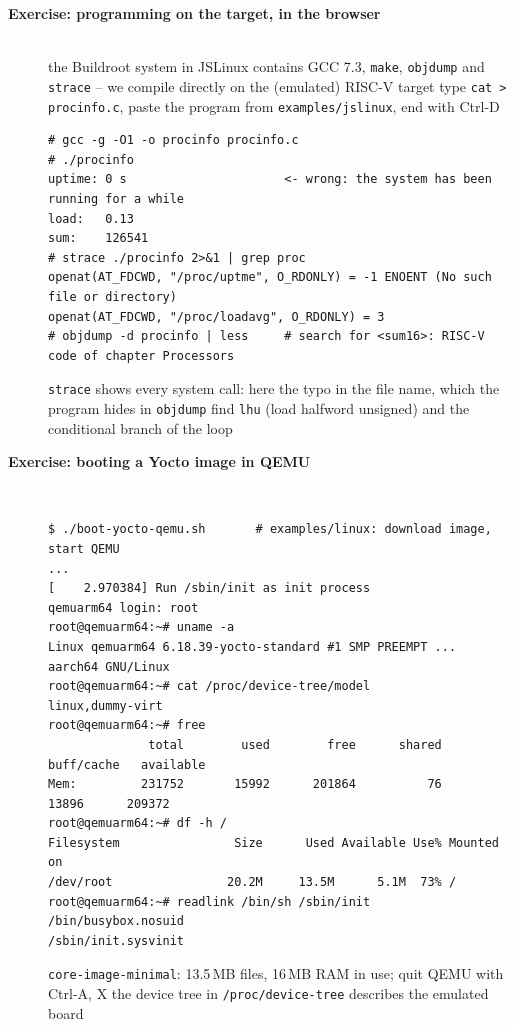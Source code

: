 \begin{description}
\item[{\rot\bf Exercise: programming on the target, in the browser}]~\\
\bi
	\ite the Buildroot system in JSLinux contains GCC 7.3, \texttt{make}, \texttt{objdump} and \texttt{strace} -- we compile directly on the (emulated) RISC-V target
	\ite type \texttt{cat > procinfo.c}, paste the program from \texttt{examples/jslinux}, end with Ctrl-D
\ei
\begin{lstlisting}[language={}]
# gcc -g -O1 -o procinfo procinfo.c
# ./procinfo
uptime: 0 s                      <- wrong: the system has been running for a while
load:   0.13
sum:    126541
# strace ./procinfo 2>&1 | grep proc
openat(AT_FDCWD, "/proc/uptme", O_RDONLY) = -1 ENOENT (No such file or directory)
openat(AT_FDCWD, "/proc/loadavg", O_RDONLY) = 3
# objdump -d procinfo | less     # search for <sum16>: RISC-V code of chapter Processors
\end{lstlisting}
\bi
	\ite \texttt{strace} shows every system call: here the typo in the file name, which the program hides
	\ite in \texttt{objdump} find \texttt{lhu} (load halfword unsigned) and the conditional branch of the loop
\ei
\os{\newpage}

\item[{\rot\bf Exercise: booting a Yocto image in QEMU}]~\\
\begin{lstlisting}[language={}]
$ ./boot-yocto-qemu.sh       # examples/linux: download image, start QEMU
...
[    2.970384] Run /sbin/init as init process
qemuarm64 login: root
root@qemuarm64:~# uname -a
Linux qemuarm64 6.18.39-yocto-standard #1 SMP PREEMPT ... aarch64 GNU/Linux
root@qemuarm64:~# cat /proc/device-tree/model
linux,dummy-virt
root@qemuarm64:~# free
              total        used        free      shared  buff/cache   available
Mem:         231752       15992      201864          76       13896      209372
root@qemuarm64:~# df -h /
Filesystem                Size      Used Available Use% Mounted on
/dev/root                20.2M     13.5M      5.1M  73% /
root@qemuarm64:~# readlink /bin/sh /sbin/init
/bin/busybox.nosuid
/sbin/init.sysvinit
\end{lstlisting}
\bi
	\ite \texttt{core-image-minimal}: 13.5\,MB files, 16\,MB RAM in use; quit QEMU with Ctrl-A, X
	\ite the device tree in \texttt{/proc/device-tree} describes the emulated board
\ei
\os{\newpage}


\end{description}
